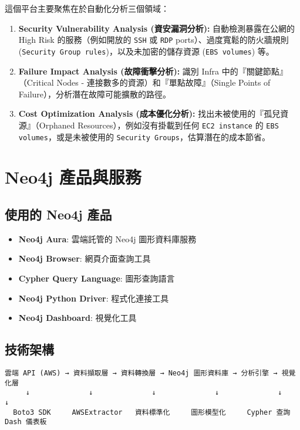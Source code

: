 \documentclass[11pt,a4paper]{ctexart}
\begin{document}
這個平台主要聚焦在於自動化分析三個領域：

\begin{enumerate}[leftmargin=1.5em]
\item \textbf{Security Vulnerability Analysis (資安漏洞分析):} 自動檢測暴露在公網的 High Risk 的服務（例如開放的 \texttt{SSH} 或 \texttt{RDP} ports）、過度寬鬆的防火牆規則 (\texttt{Security Group rules})，以及未加密的儲存資源 (\texttt{EBS volumes}) 等。

\item \textbf{Failure Impact Analysis (故障衝擊分析):} 識別 Infra 中的『關鍵節點』（Critical Nodes - 連接數多的資源）和『單點故障』（Single Points of Failure），分析潛在故障可能擴散的路徑。

\item \textbf{Cost Optimization Analysis (成本優化分析):} 找出未被使用的『孤兒資源』（Orphaned Resources），例如沒有掛載到任何 \texttt{EC2 instance} 的 \texttt{EBS volumes}，或是未被使用的 \texttt{Security Groups}，估算潛在的成本節省。
\end{enumerate}

\section{Neo4j 產品與服務}

\subsection{使用的 Neo4j 產品}
\begin{itemize}[leftmargin=1.5em]
\item \textbf{Neo4j Aura}: 雲端託管的 Neo4j 圖形資料庫服務
\item \textbf{Neo4j Browser}: 網頁介面查詢工具
\item \textbf{Cypher Query Language}: 圖形查詢語言
\item \textbf{Neo4j Python Driver}: 程式化連接工具
\item \textbf{Neo4j Dashboard}: 視覺化工具
\end{itemize}

\subsection{技術架構}
\begin{verbatim}
雲端 API (AWS) → 資料擷取層 → 資料轉換層 → Neo4j 圖形資料庫 → 分析引擎 → 視覺化層
     ↓              ↓              ↓              ↓              ↓           ↓
  Boto3 SDK     AWSExtractor   資料標準化     圖形模型化     Cypher 查詢   Dash 儀表板
\end{verbatim}
\end{document}
